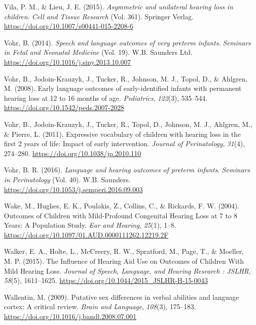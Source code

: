 \documentclass[english,man,floatsintext]{apa6}
\begin{document}
\leavevmode\hypertarget{ref-vila2015}{}%
Vila, P. M., \& Lieu, J. E. (2015). \emph{Asymmetric and unilateral hearing loss in children}. \emph{Cell and Tissue Research} (Vol. 361). Springer Verlag. \url{https://doi.org/10.1007/s00441-015-2208-6}

\leavevmode\hypertarget{ref-vohr2014}{}%
Vohr, B. (2014). \emph{Speech and language outcomes of very preterm infants}. \emph{Seminars in Fetal and Neonatal Medicine} (Vol. 19). W.B. Saunders Ltd. \url{https://doi.org/10.1016/j.siny.2013.10.007}

\leavevmode\hypertarget{ref-vohr2008}{}%
Vohr, B., Jodoin-Krauzyk, J., Tucker, R., Johnson, M. J., Topol, D., \& Ahlgren, M. (2008). Early language outcomes of early-identified infants with permanent hearing loss at 12 to 16 months of age. \emph{Pediatrics}, \emph{122}(3), 535--544. \url{https://doi.org/10.1542/peds.2007-2028}

\leavevmode\hypertarget{ref-vohr2011}{}%
Vohr, B., Jodoin-Krauzyk, J., Tucker, R., Topol, D., Johnson, M. J., Ahlgren, M., \& Pierre, L. (2011). Expressive vocabulary of children with hearing loss in the first 2 years of life: Impact of early intervention. \emph{Journal of Perinatology}, \emph{31}(4), 274--280. \url{https://doi.org/10.1038/jp.2010.110}

\leavevmode\hypertarget{ref-vohr2016}{}%
Vohr, B. R. (2016). \emph{Language and hearing outcomes of preterm infants}. \emph{Seminars in Perinatology} (Vol. 40). W.B. Saunders. \url{https://doi.org/10.1053/j.semperi.2016.09.003}

\leavevmode\hypertarget{ref-wake2004}{}%
Wake, M., Hughes, E. K., Poulakis, Z., Collins, C., \& Rickards, F. W. (2004). Outcomes of Children with Mild-Profound Congenital Hearing Loss at 7 to 8 Years: A Population Study. \emph{Ear and Hearing}, \emph{25}(1), 1--8. \url{https://doi.org/10.1097/01.AUD.0000111262.12219.2F}

\leavevmode\hypertarget{ref-walker2015}{}%
Walker, E. A., Holte, L., McCreery, R. W., Spratford, M., Page, T., \& Moeller, M. P. (2015). The Influence of Hearing Aid Use on Outcomes of Children With Mild Hearing Loss. \emph{Journal of Speech, Language, and Hearing Research : JSLHR}, \emph{58}(5), 1611--1625. \url{https://doi.org/10.1044/2015_JSLHR-H-15-0043}

\leavevmode\hypertarget{ref-wallentin2009}{}%
Wallentin, M. (2009). Putative sex differences in verbal abilities and language cortex: A critical review. \emph{Brain and Language}, \emph{108}(3), 175--183. \url{https://doi.org/10.1016/j.bandl.2008.07.001}
\end{document}
